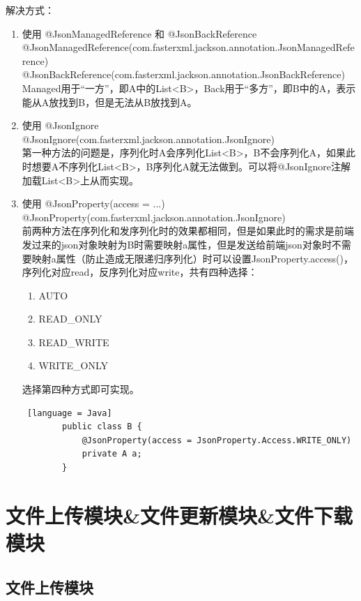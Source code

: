 解决方式：
\begin{enumerate}
  \item 使用 @JsonManagedReference 和 @JsonBackReference\\
        @JsonManagedReference(com.fasterxml.jackson.annotation.JsonManagedReference)\\
        @JsonBackReference(com.fasterxml.jackson.annotation.JsonBackReference)\\
        Managed用于“一方”，即A中的List<B>，Back用于“多方”，即B中的A，表示能从A放找到B，但是无法从B放找到A。
  \item 使用 @JsonIgnore\\
        @JsonIgnore(com.fasterxml.jackson.annotation.JsonIgnore)\\
        第一种方法的问题是，序列化时A会序列化List<B>，B不会序列化A，如果此时想要A不序列化List<B>，B序列化A就无法做到。可以将@JsonIgnore注解加载List<B>上从而实现。
  \item 使用 @JsonProperty(access = ...)\\
        @JsonProperty(com.fasterxml.jackson.annotation.JsonIgnore)\\
        前两种方法在序列化和发序列化时的效果都相同，但是如果此时的需求是前端发过来的json对象映射为B时需要映射a属性，但是发送给前端json对象时不需要映射a属性（防止造成无限递归序列化）时可以设置JsonProperty.access()，序列化对应read，反序列化对应write，共有四种选择：
        \begin{enumerate}
          \item AUTO
          \item READ\_ONLY
          \item READ\_WRITE
          \item WRITE\_ONLY
        \end{enumerate}
        选择第四种方式即可实现。
        \begin{lstlisting} [language = Java]
        public class B {
            @JsonProperty(access = JsonProperty.Access.WRITE_ONLY)
            private A a;
        }
    \end{lstlisting}
\end{enumerate}

\section{文件上传模块\&文件更新模块\&文件下载模块}

\subsection{文件上传模块}

